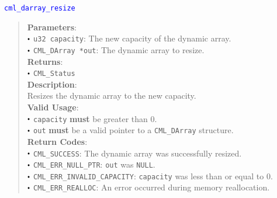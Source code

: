 \documentclass[a4paper,oneside,8pt]{extarticle}
\newcommand{\function}[1]{
  \noindent\textcolor{blue}{\texttt{#1}}
  \vspace{-0.3em}
}
\renewcommand{\dot}{\raisebox{0.3ex}{\scalebox{0.6}{$\bullet$}}}
\theoremstyle{definition}
\begin{document}
\function{cml\_darray\_resize}
\begin{quote}
  \textbf{Parameters}: \\
  $\dot$ \texttt{u32 capacity}: The new capacity of the dynamic array. \\
  $\dot$ \texttt{CML\_DArray *out}: The dynamic array to resize. \\
  \textbf{Returns}: \\
  $\dot$ \texttt{CML\_Status} \\
  
  \vspace{-0.75em}
  \textbf{Description}: \\
  Resizes the dynamic array to the new capacity. \\

  \vspace{-0.75em}
  \textbf{Valid Usage}: \\
  $\dot$ \texttt{capacity} \textbf{must} be greater than 0. \\
  $\dot$ \texttt{out} \textbf{must} be a valid pointer to a \texttt{CML\_DArray} structure. \\

  \vspace{-0.75em}
  \textbf{Return Codes}: \\
  $\dot$ \texttt{CML\_SUCCESS}: The dynamic array was successfully resized. \\
  $\dot$ \texttt{CML\_ERR\_NULL\_PTR}: \texttt{out} was \texttt{NULL}. \\
  $\dot$ \texttt{CML\_ERR\_INVALID\_CAPACITY}: \texttt{capacity} was less than or equal to 0. \\
  $\dot$ \texttt{CML\_ERR\_REALLOC}: An error occurred during memory reallocation. \\
\end{quote}
\end{document}
